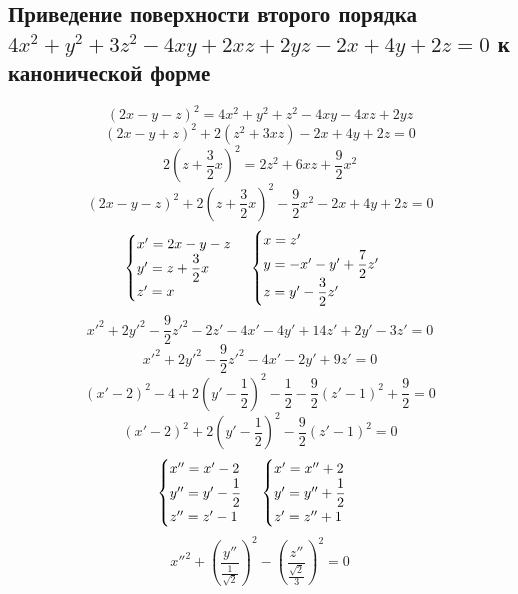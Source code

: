 \documentclass[12pt]{article}
\begin{document}
    \subsection{Приведение поверхности второго порядка $4x^2 + y^2 + 3z^2 - 4xy + 2xz + 2yz - 2x + 4y + 2z = 0$ к канонической форме}
    \[
        (2x - y - z)^2 = 4x^2 + y^2 + z^2 - 4xy - 4xz + 2yz
    \]
    \[
        (2x - y + z)^2 + 2(z^2 + 3xz) - 2x + 4y + 2z = 0
    \]
    \[
        2(z + \dfrac{3}{2}x)^2 = 2z^2 + 6xz + \dfrac{9}{2}x^2
    \]
    \[
        (2x - y - z)^2 + 2(z + \dfrac{3}{2}x)^2 - \dfrac{9}{2}x^2 - 2x + 4y + 2z = 0
    \]
    \[
        \begin{cases}
            x' = 2x - y - z        \\
            y' = z + \dfrac{3}{2}x \\
            z' = x
        \end{cases}
        \\
        \begin{cases}
            x = z'                        \\
            y = -x' - y' + \dfrac{7}{2}z' \\
            z = y' - \dfrac{3}{2}z'
        \end{cases}
    \]
    \[
        {x'}^2 + 2{y'}^2 - \dfrac{9}{2}{z'}^2 - 2z' - 4x' - 4y' + 14z' + 2y' - 3z' = 0
    \]
    \[
        {x'}^2 + 2{y'}^2 - \dfrac{9}{2}{z'}^2 - 4x' - 2y' + 9z' = 0
    \]
    \[
        (x' - 2)^2 - 4 + 2\left(y' - \dfrac{1}{2}\right)^2 - \dfrac{1}{2} - \dfrac{9}{2}\left(z' - 1\right)^2 + \dfrac{9}{2} = 0
    \]
    \[
        (x' - 2)^2 + 2\left(y' - \dfrac{1}{2}\right)^2 - \dfrac{9}{2}\left(z' - 1\right)^2 = 0
    \]
    \[
        \begin{cases}
            x'' = x' - 2            \\
            y'' = y' - \dfrac{1}{2} \\
            z'' = z' - 1
        \end{cases}
        \\
        \begin{cases}
            x' = x'' + 2            \\
            y' = y'' + \dfrac{1}{2} \\
            z' = z'' + 1
        \end{cases}
    \]
    \[
        {x''}^2 + \left(\dfrac{y''}{\frac{1}{\sqrt{2}}}\right)^2 - \left(\dfrac{z''}{\frac{\sqrt{2}}{3}}\right)^2 = 0
    \]
\end{document}
